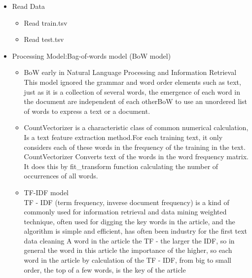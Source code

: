 \begin{itemize}
  \item
  Read Data \\
  \begin{itemize}
  \item
  Read train.tsv
  \item
  Read test.tsv
  \end{itemize}
  \item
  Processing Model:Bag-of-words model (BoW model)\\
  \begin{itemize}
    \item 
    BoW early in Natural Language Processing and Information Retrieval 
    This model ignored the grammar and word order elements such as text, 
    just as it is a collection of several words, the emergence of each
     word in the document are independent of each otherBoW to use an 
     unordered list of words to express a text or a document.
  \end{itemize}
   \begin{itemize}
    \item
    CountVectorizer is a characteristic class of common numerical calculation,
    Is a text feature extraction method.For each training text, it only considers 
    each of these words in the frequency of the training in the text.
    CountVectorizer Converts text of the words in the word frequency matrix.
    It does this by fit_transform function calculating the number of occurrences of all words.
    \end{itemize}
  \begin{itemize}
    \item  TF-IDF model\\
    TF - IDF (term frequency, inverse document frequency) is a kind of commonly 
    used for information retrieval and data mining weighted technique, often used
     for digging the key words in the article, and the algorithm is simple and efficient,
      has often been industry for the first text data cleaning
      A word in the article the TF - the larger the IDF, so in general the word in 
      this article the importance of the higher, so each word in the article by calculation 
      of the TF - IDF, from big to small order, the top of a few words, is the key of the article
  \end{itemize}
  

\end{itemize}
